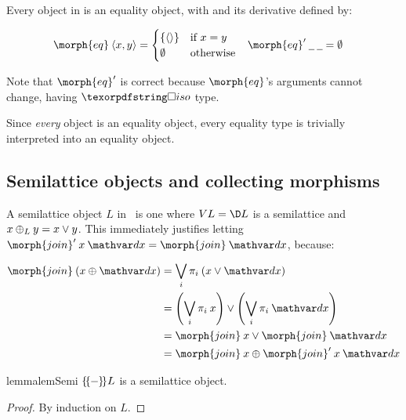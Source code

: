 Every object in \CP{} is an equality object, with  and its derivative
defined by:

\nopagebreak[2]
\begin{align*}
  \morph{eq}\<\tuple{x,y} &= 
  \begin{cases}
    \{\tuple{}\} & \text{if}~ x = y\\
    \emptyset & \text{otherwise}
  \end{cases}
  &
  \deriv{\morph{eq}} \<\pwild \<\pwild &= \emptyset
\end{align*}

\noindent Note that $\deriv{\morph{eq}}$ is correct because $\morph{eq}$'s
arguments cannot change, having $\iso$ type.

Since \emph{every} object is an equality object, every equality type
is trivially interpreted into an equality object. 


\subsection{Semilattice objects and collecting morphisms}
\label{sec:CP-semilattice}

A semilattice object $L$ in \CP\ is one where $\vals L = \chgs L$ is a
semilattice and $x \mathbin{\oplus}_L y = x \vee y$.  This immediately justifies
letting $\deriv{\morph{join}} \<x \<\dx = \morph{join}\<\dx$, because:

\nopagebreak[2]
\begin{align*}
  \morph{join}\<(x \upd \dx) &= \bigvee_i \pi_i \<(x \vee \dx)\\
  &= \left(\bigvee_i \pi_i\<x\right) \vee \left(\bigvee_i \pi_i\<\dx\right)\\
  &= \morph{join}\<x \vee \morph{join}\<\dx\\
  &= \morph{join}\<x \upd \deriv{\morph{join}}\<x\<\dx
\end{align*}

\begin{restatable}{lemma}{lemSemi}
  \label{lem:semi} $\{\kern-.18em\{\kern-.05em{-}\kern-.05em\}\kern -.18em\} L$ is a semilattice object. 
\end{restatable}
\begin{proof}
  By induction on $L$. \XXX
\end{proof}

